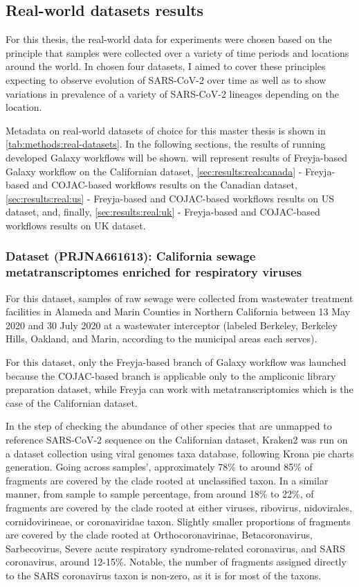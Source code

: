     \subsection{Real-world datasets results} \label{sec:results:real}
    For this thesis, the real-world data for experiments were chosen based on the principle that samples were collected over a variety of time periods and locations around the world. In chosen four datasets, I aimed to cover these principles expecting to observe evolution of SARS-CoV-2 over time as well as to show variations in prevalence of a variety of SARS-CoV-2 lineages depending on the location.

    Metadata on real-world datasets of choice for this master thesis is shown in \cref{tab:methods:real-datasets}. In the following sections, the results of running developed Galaxy workflows will be shown.  will represent results of Freyja-based Galaxy workflow on the Californian dataset, \cref{sec:results:real:canada} - Freyja-based and COJAC-based workflows results on the Canadian dataset, \cref{sec:results:real:us} - Freyja-based and COJAC-based workflows results on US dataset, and, finally, \cref{sec:results:real:uk} - Freyja-based and COJAC-based workflows results on UK dataset. 
    \subsubsection{Dataset (PRJNA661613): California sewage metatranscriptomes enriched for respiratory viruses} \label{sec:results:real:california}
    For this dataset, samples of raw sewage were collected from wastewater treatment facilities in Alameda and Marin Counties in Northern California between 13 May 2020 and 30 July 2020 at a wastewater interceptor (labeled Berkeley, Berkeley Hills, Oakland, and Marin, according to the municipal areas each serves).

    For this dataset, only the Freyja-based branch of Galaxy workflow was launched because the COJAC-based branch is applicable only to the ampliconic library preparation dataset, while Freyja can work with metatranscriptomics which is the case of the Californian dataset.
    
    In the step of checking the abundance of other species that are unmapped to reference SARS-CoV-2 sequence on the Californian dataset, Kraken2 was run on a dataset collection using viral genomes taxa database, following Krona pie charts generation. Going across samples’, approximately 78\% to around 85\% of fragments are covered by the clade rooted at unclassified taxon. In a similar manner, from sample to sample percentage, from around 18\% to 22\%, of fragments are covered by the clade rooted at either viruses, ribovirus, nidovirales, cornidovirineae, or coronaviridae taxon. Slightly smaller proportions of fragments are covered by the clade rooted at Orthocoronavirinae, Betacoronavirus, Sarbecovirus, Severe acute respiratory syndrome-related coronavirus, and SARS coronavirus, around 12-15\%. Notable, the number of fragments assigned directly to the SARS coronavirus taxon is non-zero, as it is for most of the taxons. 
    
